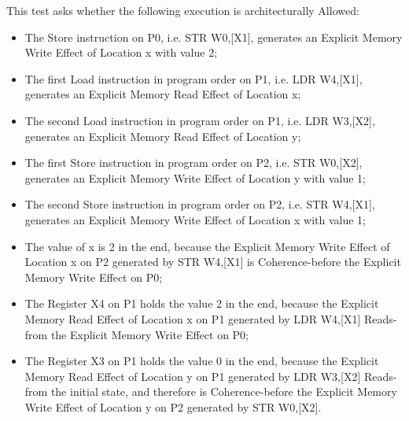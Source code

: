 This test asks whether the following execution is architecturally Allowed:

\begin{itemize}
  \item The Store instruction on P0, i.e. STR W0,[X1], generates an Explicit Memory Write Effect of Location x with value 2;
  \item The first Load instruction in program order on P1, i.e. LDR W4,[X1], generates an Explicit Memory Read Effect of Location x;
  \item The second Load instruction in program order on P1, i.e. LDR W3,[X2], generates an Explicit Memory Read Effect of Location y;
  \item The first Store instruction in program order on P2, i.e. STR W0,[X2], generates an Explicit Memory Write Effect of Location y with value 1;
  \item The second Store instruction in program order on P2, i.e. STR W4,[X1], generates an Explicit Memory Write Effect of Location x with value 1;
  \item The value of x is 2 in the end, because the Explicit Memory Write Effect of Location x on P2 generated by STR W4,[X1] is Coherence-before the Explicit Memory Write Effect on P0;
  \item The Register X4 on P1 holds the value 2 in the end, because the Explicit Memory Read Effect of Location x on P1 generated by LDR W4,[X1] Reads-from the Explicit Memory Write Effect on P0;
  \item The Register X3 on P1 holds the value 0 in the end, because the Explicit Memory Read Effect of Location y on P1 generated by LDR W3,[X2] Reads-from the initial state, and therefore is Coherence-before the Explicit Memory Write Effect of Location y on P2 generated by STR W0,[X2].
\end{itemize}
